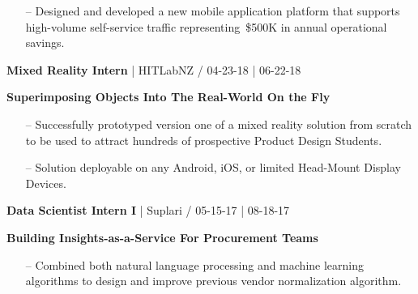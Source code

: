 \documentclass{article}
\begin{document}
\begin{multicols}{2}
{{\begin{itemize}
	\item[--] Designed and developed a new mobile application platform that supports high-volume self-service traffic representing~\$500K in annual operational savings.
\end{itemize}
}}
\hfill \break
{\footnotesize{\textbf{Mixed Reality Intern} | HITLabNZ / 04-23-18 | 06-22-18 }}
{\footnotesize{
\newline\textbf{Superimposing Objects Into The Real-World On the Fly}
\begin{itemize}
	\item[--] Successfully prototyped version one of a mixed reality solution from scratch to be used to attract hundreds of prospective Product Design Students.
	\item[--] Solution deployable on any Android, iOS, or limited Head-Mount Display Devices.
\end{itemize}
}}
\hfill \break
{\footnotesize{\textbf{Data Scientist Intern I} | Suplari / 05-15-17 | 08-18-17}}
{\footnotesize{
\newline\textbf{Building Insights-as-a-Service For Procurement Teams}
\begin{itemize}
	\item[--] Combined both natural language processing and machine learning algorithms to design and improve previous vendor normalization algorithm.

\end{itemize}}}
\end{multicols}
\end{document}
